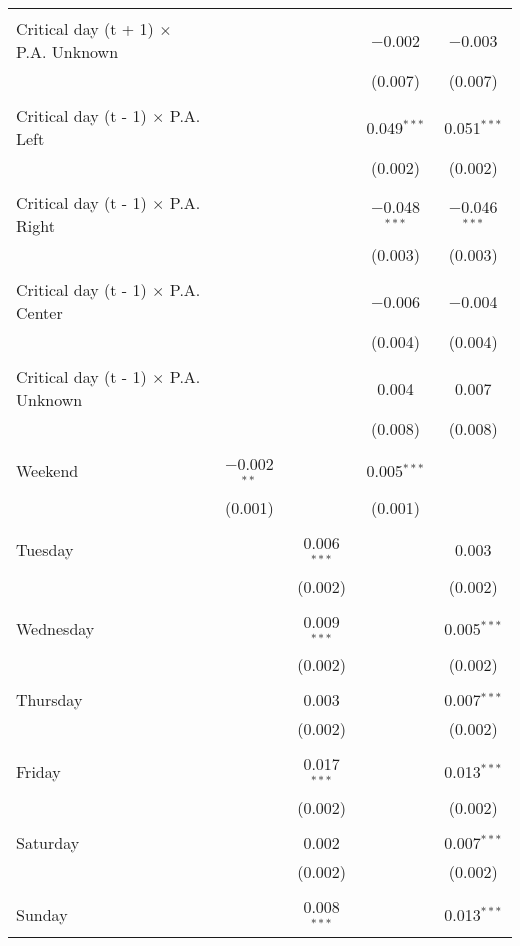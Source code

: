 \documentclass[
]{article}
\begin{document}
\begin{table}[!htbp]
{\begin{tabular}{@{\extracolsep{5pt}}lcccc}
  & & & & \\ 
 Critical day (t + 1) $\times$ P.A. Unknown &  &  & $-$0.002 & $-$0.003 \\ 
  &  &  & (0.007) & (0.007) \\ 
  & & & & \\ 
 Critical day (t - 1) $\times$ P.A. Left &  &  & 0.049$^{***}$ & 0.051$^{***}$ \\ 
  &  &  & (0.002) & (0.002) \\ 
  & & & & \\ 
 Critical day (t - 1) $\times$ P.A. Right &  &  & $-$0.048$^{***}$ & $-$0.046$^{***}$ \\ 
  &  &  & (0.003) & (0.003) \\ 
  & & & & \\ 
 Critical day (t - 1) $\times$ P.A. Center &  &  & $-$0.006 & $-$0.004 \\ 
  &  &  & (0.004) & (0.004) \\ 
  & & & & \\ 
 Critical day (t - 1) $\times$ P.A. Unknown &  &  & 0.004 & 0.007 \\ 
  &  &  & (0.008) & (0.008) \\ 
  & & & & \\ 
 Weekend & $-$0.002$^{**}$ &  & 0.005$^{***}$ &  \\ 
  & (0.001) &  & (0.001) &  \\ 
  & & & & \\ 
 Tuesday &  & 0.006$^{***}$ &  & 0.003 \\ 
  &  & (0.002) &  & (0.002) \\ 
  & & & & \\ 
 Wednesday &  & 0.009$^{***}$ &  & 0.005$^{***}$ \\ 
  &  & (0.002) &  & (0.002) \\ 
  & & & & \\ 
 Thursday &  & 0.003 &  & 0.007$^{***}$ \\ 
  &  & (0.002) &  & (0.002) \\ 
  & & & & \\ 
 Friday &  & 0.017$^{***}$ &  & 0.013$^{***}$ \\ 
  &  & (0.002) &  & (0.002) \\ 
  & & & & \\ 
 Saturday &  & 0.002 &  & 0.007$^{***}$ \\ 
  &  & (0.002) &  & (0.002) \\ 
  & & & & \\ 
 Sunday &  & 0.008$^{***}$ &  & 0.013$^{***}$ \\ 

\end{tabular}}
\end{table}
\end{document}
